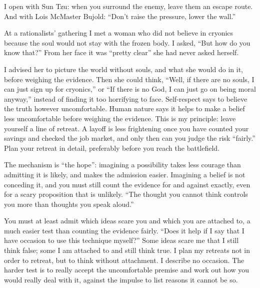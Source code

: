 
I open with Sun Tzu: when you surround the enemy, leave them an escape route. And with Lois McMaster Bujold: ``Don't raise the pressure, lower the wall.''

At a rationalists' gathering I met a woman who did not believe in cryonics because the soul would not stay with the frozen body. I asked, ``But how do you know that?'' From her face it was ``pretty clear'' she had never asked herself.

I advised her to picture the world without souls, and what she would do in it, before weighing the evidence. Then she could think, ``Well, if there are no souls, I can just sign up for cryonics,'' or ``If there is no God, I can just go on being moral anyway,'' instead of finding it too horrifying to face. Self-respect says to believe the truth however uncomfortable. Human nature says it helps to make a belief less uncomfortable before weighing the evidence. This is my principle: leave yourself a line of retreat. A layoff is less frightening once you have counted your savings and checked the job market, and only then can you judge the risk ``fairly.'' Plan your retreat in detail, preferably before you reach the battlefield. 

The mechanism is ``the hope'': imagining a possibility takes less courage than admitting it is likely, and makes the admission easier. Imagining a belief is not conceding it, and you must still count the evidence for and against exactly, even for a scary proposition that is unlikely. ``The thought you cannot think controls you more than thoughts you speak aloud.'' 

You must at least admit which ideas scare you and which you are attached to, a much easier test than counting the evidence fairly. ``Does it help if I say that I have occasion to use this technique myself?'' Some ideas scare me that I still think false; some I am attached to and still think true. I plan my retreats not in order to retreat, but to think without attachment. I describe no occasion. The harder test is to really accept the uncomfortable premise and work out how you would really deal with it, against the impulse to list reasons it cannot be so.

